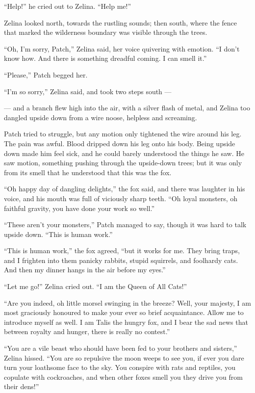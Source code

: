 \documentclass[ebook,oneside,openany,17pt]{memoir}
\begin{document}
“Help!” he cried out to Zelina. “Help me!”

Zelina looked north, towards the rustling sounds; then south, where
the fence that marked the wilderness boundary was visible through the
trees.

“Oh, I’m sorry, Patch,” Zelina said, her voice quivering with
emotion. “I don’t know how. And there is something dreadful coming. I
can smell it.”

“Please,” Patch begged her.

“I’m so sorry,” Zelina said, and took two steps south —

— and a branch flew high into the air, with a silver flash of metal,
and Zelina too dangled upside down from a wire noose, helpless and
screaming.

Patch tried to struggle, but any motion only tightened the wire around
his leg. The pain was awful. Blood dripped down his leg onto his
body. Being upside down made him feel sick, and he could barely
understood the things he saw. He saw motion, something pushing through
the upside-down trees; but it was only from its smell that he
understood that this was the fox.

“Oh happy day of dangling delights,” the fox said, and there was
laughter in his voice, and his mouth was full of viciously sharp
teeth. “Oh loyal monsters, oh faithful gravity, you have done your
work so well.”

“These aren’t your monsters,” Patch managed to say, though it was hard
to talk upside down. “This is human work.”

“This is human work,” the fox agreed, “but it works for me. They bring
traps, and I frighten into them panicky rabbits, stupid squirrels, and
foolhardy cats. And then my dinner hangs in the air before my eyes.”

“Let me go!” Zelina cried out. “I am the Queen of All Cats!”

“Are you indeed, oh little morsel swinging in the breeze? Well, your
majesty, I am most graciously honoured to make your ever so brief
acquaintance. Allow me to introduce myself as well. I am Talis the
hungry fox, and I bear the sad news that between royalty and hunger,
there is really no contest.”

“You are a vile beast who should have been fed to your brothers and
sisters,” Zelina hissed. “You are so repulsive the moon weeps to see
you, if ever you dare turn your loathsome face to the sky. You
conspire with rats and reptiles, you copulate with cockroaches, and
when other foxes smell you they drive you from their dens!”
\end{document}
